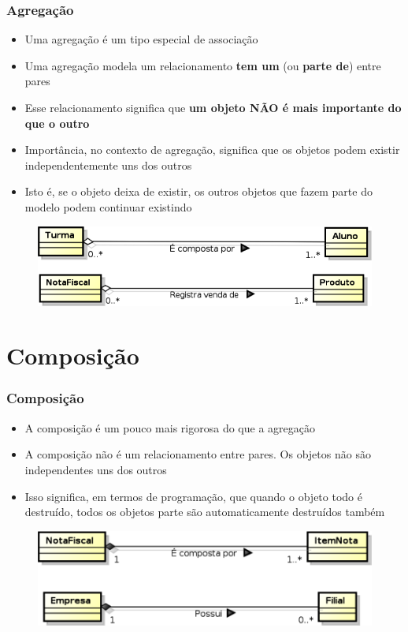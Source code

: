 \documentclass[aspectratio=169]{beamer}
\begin{document}
\begin{frame}\frametitle{Agregação}
\begin{itemize}
	\item Uma agregação é um tipo especial de associação
	\item Uma agregação modela um relacionamento \textbf{tem um} (ou \textbf{parte de}) entre pares
	\item Esse relacionamento significa que \textbf{um objeto NÃO é mais importante do que o outro}
	\item Importância, no contexto de agregação, significa que os objetos podem existir independentemente uns dos outros
	\item Isto é, se o objeto deixa de existir, os outros objetos que fazem parte do modelo podem continuar existindo
\end{itemize}
\begin{figure}[h]
	\includegraphics[height=0.25\paperheight]{imagens/agregacao.png}
\end{figure}
\end{frame}

\section{Composição}

\begin{frame}\frametitle{Composição}
\begin{itemize}
	\item A composição é um pouco mais rigorosa do que a agregação
	\item A composição não é um relacionamento entre pares. Os objetos não são independentes uns dos outros
	\item Isso significa, em termos de programação, que quando o objeto todo é destruído, todos os objetos parte são automaticamente destruídos também
\end{itemize}
\begin{figure}[h]
	\includegraphics[height=0.25\paperheight]{imagens/composicao.png}
\end{figure}
\end{frame}
\end{document}
